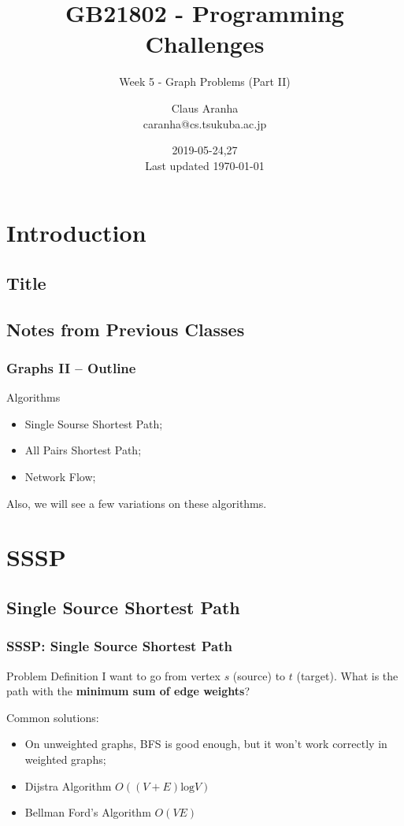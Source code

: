 \documentclass{beamer}
\title[GB21802]{GB21802 - Programming Challenges}
\subtitle[]{Week 5 - Graph Problems (Part II)}
\author[Claus Aranha]{Claus Aranha\\{\footnotesize caranha@cs.tsukuba.ac.jp}}
\institute{College of Information Science}
\date{2019-05-24,27\\{\tiny Last updated \today}}
\begin{document}
\section{Introduction}
\subsection{Title}
\begin{frame}
\maketitle
\end{frame}

\subsection{Notes from Previous Classes}

% 

\begin{frame}
  \frametitle{Graphs II -- Outline}
  \begin{block}{Algorithms}
    \begin{itemize}
    \item Single Sourse Shortest Path;
    \item All Pairs Shortest Path;
    \item Network Flow;
    \end{itemize}
  \end{block}

  \bigskip

  Also, we will see a few variations on these algorithms.
\end{frame}

\section{SSSP}

\subsection{Single Source Shortest Path}
\begin{frame}
  \frametitle{SSSP: Single Source Shortest Path}
  \begin{block}{Problem Definition}
    I want to go from vertex $s$ (source) to $t$ (target). What is
    the path with the {\bf minimum sum of edge weights}?
  \end{block}

  \bigskip

  {\smaller
    Common solutions:

    \begin{itemize}
    \item On \alert{unweighted} graphs, BFS is good enough, but it
      won't work correctly in weighted graphs;
    \item Dijstra Algorithm $O((V+E)\text{log}V)$
    \item Bellman Ford's Algorithm $O(VE)$
    \end{itemize}
  }
\end{frame}
\end{document}
